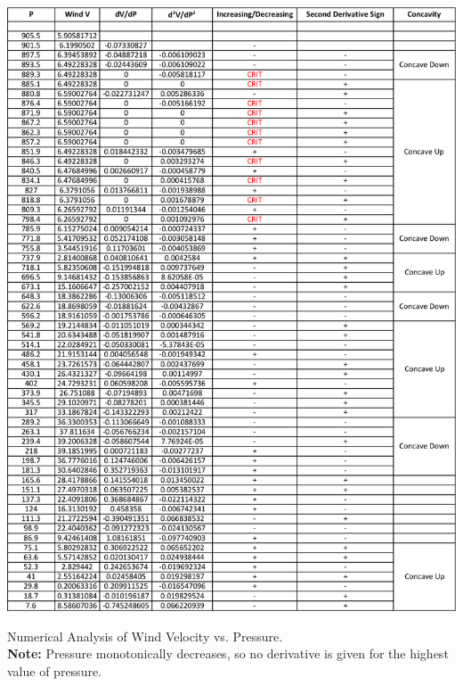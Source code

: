 \documentclass{article}
\begin{document}
\begin{table}[H]
\centering
\includegraphics[width=\textwidth]{PANDA.png}
\caption{Numerical Analysis of Wind Velocity vs. Pressure.\\\textbf{Note:} Pressure monotonically decreases, so no derivative is given for the highest value of pressure.}
\end{table}
\end{document}
